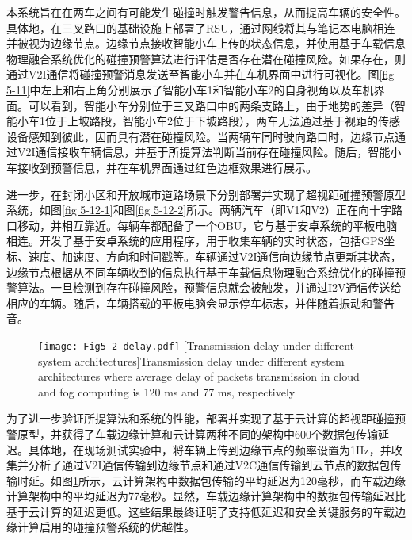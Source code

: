 本系统旨在在两车之间有可能发生碰撞时触发警告信息，从而提高车辆的安全性。具体地，在三叉路口的基础设施上部署了RSU，通过网线将其与笔记本电脑相连并被视为边缘节点。边缘节点接收智能小车上传的状态信息，并使用基于车载信息物理融合系统优化的碰撞预警算法进行评估是否存在潜在碰撞风险。如果存在，则通过V2I通信将碰撞预警消息发送至智能小车并在车机界面中进行可视化。图\ref{fig 5-11}中左上和右上角分别展示了智能小车1和智能小车2的自身视角以及车机界面。可以看到，智能小车分别位于三叉路口中的两条支路上，由于地势的差异（智能小车1位于上坡路段，智能小车2位于下坡路段），两车无法通过基于视距的传感设备感知到彼此，因而具有潜在碰撞风险。当两辆车同时驶向路口时，边缘节点通过V2I通信接收车辆信息，并基于所提算法判断当前存在碰撞风险。随后，智能小车接收到预警信息，并在车机界面通过红色边框效果进行展示。

进一步，在封闭小区和开放城市道路场景下分别部署并实现了超视距碰撞预警原型系统，如图\ref{fig 5-12-1}和图\ref{fig 5-12-2}所示。两辆汽车（即V1和V2）正在向十字路口移动，并相互靠近。每辆车都配备了一个OBU，它与基于安卓系统的平板电脑相连。开发了基于安卓系统的应用程序，用于收集车辆的实时状态，包括GPS坐标、速度、加速度、方向和时间戳等。车辆通过V2I通信向边缘节点更新其状态，边缘节点根据从不同车辆收到的信息执行基于车载信息物理融合系统优化的碰撞预警算法。一旦检测到存在碰撞风险，预警信息就会被触发，并通过I2V通信传送给相应的车辆。随后，车辆搭载的平板电脑会显示停车标志，并伴随着振动和警告音。

\begin{figure}[h]
\centering
  \texttt{[image: Fig5-2-delay.pdf]}
  [Transmission delay under different system architectures]{Transmission delay under different system architectures where average delay of packets transmission in cloud and fog computing is 120 ms and 77 ms, respectively}
  \label{fig 5-2}
\end{figure}

为了进一步验证所提算法和系统的性能，部署并实现了基于云计算的超视距碰撞预警原型，并获得了车载边缘计算和云计算两种不同的架构中600个数据包传输延迟。具体地，在现场测试实验中，将车辆上传到边缘节点的频率设置为1Hz，并收集并分析了通过V2I通信传输到边缘节点和通过V2C通信传输到云节点的数据包传输时延。如图\ref{fig 5-2}所示，云计算架构中数据包传输的平均延迟为120毫秒，而车载边缘计算架构中的平均延迟为77毫秒。显然，车载边缘计算架构中的数据包传输延迟比基于云计算的延迟更低。这些结果最终证明了支持低延迟和安全关键服务的车载边缘计算启用的碰撞预警系统的优越性。

